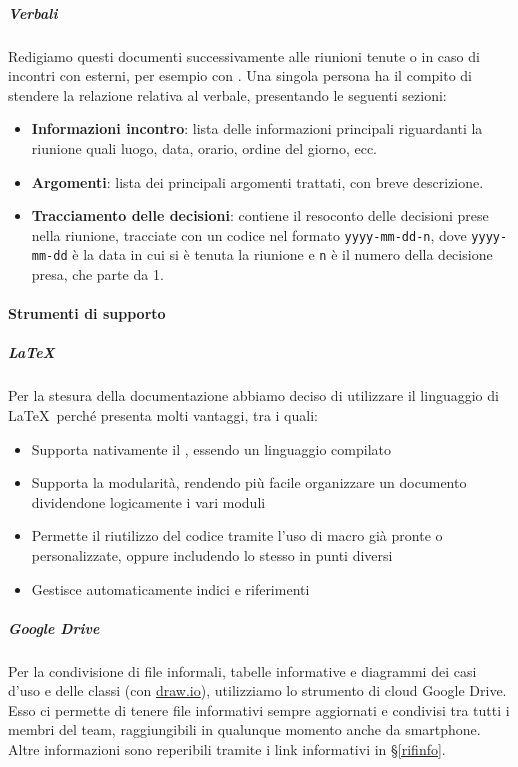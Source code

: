 
            \subparagraph{Verbali}\label{Verbali}
			Redigiamo questi documenti successivamente alle riunioni tenute	o in caso di incontri con  esterni, per esempio con \II. Una singola persona ha il compito di stendere
			la relazione relativa al verbale, presentando le seguenti sezioni:
			\begin{itemize}
				\item \textbf{Informazioni incontro}: lista delle informazioni principali riguardanti la riunione quali luogo, data, orario, ordine del giorno, ecc.
				\item \textbf{Argomenti}: lista dei principali argomenti trattati, con breve descrizione.
				\item \textbf{Tracciamento delle decisioni}: contiene il resoconto delle decisioni prese nella riunione, tracciate con un codice nel formato \texttt{yyyy-mm-dd-n}, dove \texttt{yyyy-mm-dd} è
				la data in cui si è tenuta la riunione e \texttt{n} è il numero della decisione presa, che parte da 1.

			\end{itemize}


			\paragraph{Strumenti di supporto}\label{StrumentiDiSupporto}

			\subparagraph{\LaTeX}\label{LaTeX}
			Per la stesura della documentazione abbiamo deciso di utilizzare il linguaggio di  \LaTeX\ perché presenta molti vantaggi, tra i quali:
			\begin{itemize}
				\item Supporta nativamente il , essendo un linguaggio compilato
				\item Supporta la modularità, rendendo più facile organizzare un documento dividendone logicamente i vari moduli
				\item Permette il riutilizzo del codice tramite l'uso di macro già pronte o personalizzate, oppure includendo lo stesso  in punti diversi
				\item Gestisce automaticamente indici e riferimenti
			\end{itemize}

			\subparagraph{Google Drive}\label{GoogleDrive}
			Per la condivisione di file informali, tabelle informative e diagrammi dei casi d'uso e delle classi (con \hyperref[drawio]{draw.io}), utilizziamo lo strumento
			di cloud Google Drive. Esso ci permette di tenere file informativi sempre aggiornati e condivisi tra tutti i membri del team, raggiungibili in qualunque momento
			anche da smartphone. Altre informazioni sono reperibili tramite i link informativi in \S\ref{rifinfo}.

